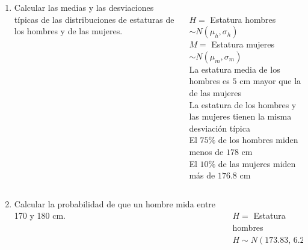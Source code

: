 \documentclass[aspectratio=149,10pt,xcolor=dvipsnames,t]{beamer}
\begin{document}
\begin{frame}
\begin{columns}
\begin{column}[T]{0.55\textwidth}
\begin{enumerate}
\item Calcular las medias y las desviaciones típicas de las distribuciones de estaturas de los hombres y de las mujeres.
\end{enumerate}
\end{column}
\begin{column}[T]{0.45\textwidth}
\\
$H=$ Estatura hombres $\sim N(\mu_h,\sigma_h)$\\
$M=$ Estatura mujeres $\sim N(\mu_m,\sigma_m)$\\
La estatura media de los hombres es $5$ cm mayor que la de las mujeres\\[5mm]
La estatura de los hombres y las mujeres tienen la misma desviación típica\\[5mm]
El $75\%$ de los hombres miden menos de $178$ cm\\[5mm]
El $10\%$ de las mujeres miden más de $176.8$ cm
\end{column}
\end{columns}
\end{frame}


\begin{frame}
\begin{columns}
\begin{column}[T]{0.6\textwidth}
\begin{enumerate}
\setcounter{enumi}{1}
\item Calcular la probabilidad de que un hombre mida entre 170 y 180 cm.
\end{enumerate}
\end{column}
\begin{column}[T]{0.4\textwidth}
\\
$H=$ Estatura hombres \\
$H \sim N(173.83,\,6.23)$
\end{column}
\end{columns}
\end{frame}
\end{document}
